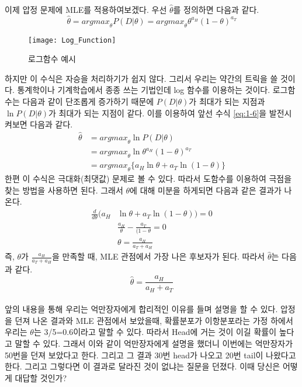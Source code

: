 \documentclass[a4paper]{oblivoir}
\begin{document}
이제 압정 문제에 MLE를 적용하여보겠다. 우선 $\hat{\theta}$를 정의하면 다음과 같다.
\begin{equation}
\hat{\theta}={argmax}_{\theta}P(D| \theta)={argmax}_{\theta}\theta^{a_H}(1-\theta)^{a_T}
\label{eq:1-6}
\end{equation}
\begin{figure}[ht]\centering
\texttt{[image: Log\_Function]}\caption{로그함수 예시}\label{Fig:1-18}
\end{figure}
\indent 하지만 이 수식은 자승을 처리하기가 쉽지 않다. 그리서 우리는 약간의 트릭을 쓸 것이다. 통계학이나 기계학습에서 종종 쓰는 기법인데 log 함수를 이용하는 것이다. 로그함수는 다음과 같이 단조롭게 증가하기 때문에 $P(D| \theta)$가 최대가 되는 지점과 $\ln P(D| \theta)$가 최대가 되는 지점이 같다. 이를 이용하여 앞선 수식 \eqref{eq:1-6}을 발전시켜보면 다음과 같다.
\begin{equation}
\begin{split}
\hat{\theta}&={argmax}_{\theta}\ln P(D| \theta)\\
&={argmax}_{\theta}\ln\theta^{a_H}(1-\theta)^{a_T}\\
&={argmax}_{\theta}\{a_H\ln\theta+{a_T}\ln(1-\theta)\}
\end{split}
\label{eq:1-7}
\end{equation}
\indent 한편 이 수식은 극대화(최댓값) 문제로 볼 수 있다. 따라서 도함수를 이용하여 극점을 찾는 방법을 사용하면 된다. 그래서 $\theta$에 대해 미분을 하게되면 다음과 같은 결과가 나온다.
\begin{align}
\frac{d}{d\theta}(a_H&\ln\theta+a_T\ln(1-\theta))=0 \\
&\frac{a_H}{\theta}-\frac{a_T}{(1-\theta}=0 \\
&\theta=\frac{a_H}{a_T+a_H}
\end{align}
\indent 즉, $\theta$가 $\frac{a_H}{a_T+a_H}$을 만족할 때, MLE 관점에서 가장 나은 후보자가 된다. 따라서 $\hat{\theta}$는 다음과 같다.
\begin{equation}
\hat{\theta}=\frac{a_H}{a_H+a_T}
\label{eq:1-11}
\end{equation}\\

\indent 앞의 내용을 통해 우리는 억만장자에게 합리적인 이유를 들며 설명을 할 수 있다. 압정을 던져 나온 결과와 MLE 관점에서 보았을때, 확률분포가 이항분포라는 가정 하에서 우리는 $\theta$는 3/5=0.6이라고 말할 수 있다. 따라서 Head에 거는 것이 이길 확률이 높다고 말할 수 있다. 그래서 이와 같이 억만장자에게 설명을 했더니 이번에는 억만장자가 50번을 던져 보았다고 한다. 그리고 그 결과 30번 head가 나오고 20번 tail이 나왔다고 한다. 그리고 그렇다면 이 결과로 달라진 것이 없냐는 질문을 던졌다. 이때 당신은 어떻게 대답할 것인가?\\
\end{document}
